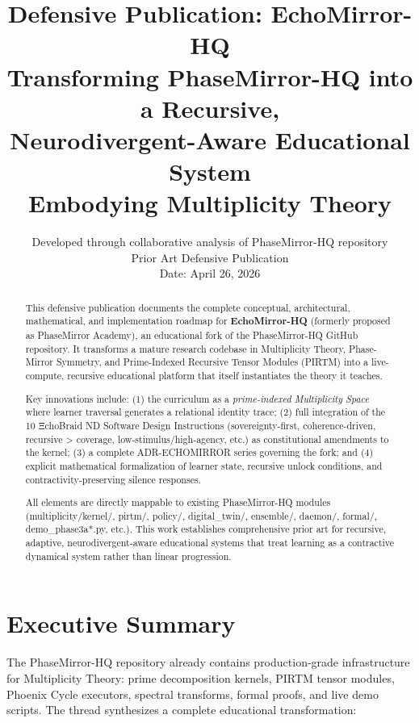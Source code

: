 \documentclass[11pt,letterpaper]{article}
\title{\textbf{Defensive Publication: EchoMirror-HQ \\ 
Transforming PhaseMirror-HQ into a Recursive, \\ 
Neurodivergent-Aware Educational System \\ 
Embodying Multiplicity Theory}}
\author{Developed through collaborative analysis of PhaseMirror-HQ repository \\ 
Prior Art Defensive Publication \\ 
Date: April 26, 2026}
\date{}
\begin{document}
\maketitle

\begin{abstract}
This defensive publication documents the complete conceptual, architectural, mathematical, and implementation roadmap for \textbf{EchoMirror-HQ} (formerly proposed as PhaseMirror Academy), an educational fork of the PhaseMirror-HQ GitHub repository. It transforms a mature research codebase in Multiplicity Theory, Phase-Mirror Symmetry, and Prime-Indexed Recursive Tensor Modules (PIRTM) into a live-compute, recursive educational platform that itself instantiates the theory it teaches. 

Key innovations include: (1) the curriculum as a \emph{prime-indexed Multiplicity Space} where learner traversal generates a relational identity trace; (2) full integration of the 10 ΞchoBraid ND Software Design Instructions (sovereignty-first, coherence-driven, recursive > coverage, low-stimulus/high-agency, etc.) as constitutional amendments to the kernel; (3) a complete ADR-ECHOMIRROR series governing the fork; and (4) explicit mathematical formalization of learner state, recursive unlock conditions, and contractivity-preserving silence responses. 

All elements are directly mappable to existing PhaseMirror-HQ modules (multiplicity/kernel/, pirtm/, policy/, digital\_twin/, ensemble/, daemon/, formal/, demo\_phase3a*.py, etc.). This work establishes comprehensive prior art for recursive, adaptive, neurodivergent-aware educational systems that treat learning as a contractive dynamical system rather than linear progression.
\end{abstract}

\section{Executive Summary}
The PhaseMirror-HQ repository already contains production-grade infrastructure for Multiplicity Theory: prime decomposition kernels, PIRTM tensor modules, Phoenix Cycle executors, spectral transforms, formal proofs, and live demo scripts. The thread synthesizes a complete educational transformation:
\end{document}
